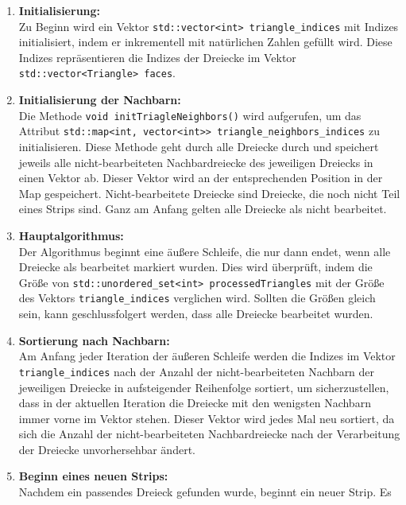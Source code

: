 \begin{enumerate}
	\item \textbf{Initialisierung:} 
	\\
	Zu Beginn wird ein Vektor \lstinline{std::vector<int> triangle_indices} mit
	Indizes initialisiert, indem er inkrementell mit natürlichen Zahlen
	gefüllt wird. Diese Indizes repräsentieren die Indizes der Dreiecke im
	Vektor \lstinline{std::vector<Triangle> faces}.
	\\
	\item \textbf{Initialisierung der Nachbarn:} 
	\\
	Die Methode \lstinline{void initTriagleNeighbors()} wird aufgerufen, um das Attribut \break
	\lstinline{std::map<int, vector<int>> triangle_neighbors_indices} zu initialisieren.
	Diese Methode geht durch alle Dreiecke durch und speichert jeweils alle
	nicht-bearbeiteten Nachbardreiecke des jeweiligen Dreiecks in einen Vektor
	ab. Dieser Vektor wird an der entsprechenden Position in der Map
	gespeichert. Nicht-bearbeitete Dreiecke sind Dreiecke, die noch nicht Teil
	eines Strips sind. Ganz am Anfang gelten alle Dreiecke als nicht bearbeitet.
	\\
	\item \textbf{Hauptalgorithmus:} 
	\\
	Der Algorithmus beginnt eine äußere Schleife, die nur dann endet, wenn alle
	Dreiecke als bearbeitet markiert wurden. Dies wird überprüft, indem die
	Größe von \lstinline{std::unordered_set<int> processedTriangles} mit der Größe des
	Vektors \lstinline{triangle_indices} verglichen wird. Sollten die Größen gleich sein,
	kann geschlussfolgert werden, dass alle Dreiecke bearbeitet wurden.
	\\
	\item \textbf{Sortierung nach Nachbarn:} 
	\\
	Am Anfang jeder Iteration der äußeren Schleife werden die Indizes im Vektor
	\lstinline{triangle_indices} nach der Anzahl der nicht-bearbeiteten Nachbarn der
	jeweiligen Dreiecke in aufsteigender Reihenfolge sortiert, um
	sicherzustellen, dass in der aktuellen Iteration die Dreiecke mit den
	wenigsten Nachbarn immer vorne im Vektor stehen. Dieser Vektor wird jedes
	Mal neu sortiert, da sich die Anzahl der nicht-bearbeiteten Nachbardreiecke
	nach der Verarbeitung der Dreiecke unvorhersehbar ändert.
	\\
	\item \textbf{Beginn eines neuen Strips:} 
	\\
	Nachdem ein passendes Dreieck gefunden wurde, beginnt ein neuer Strip. Es

\end{enumerate}

